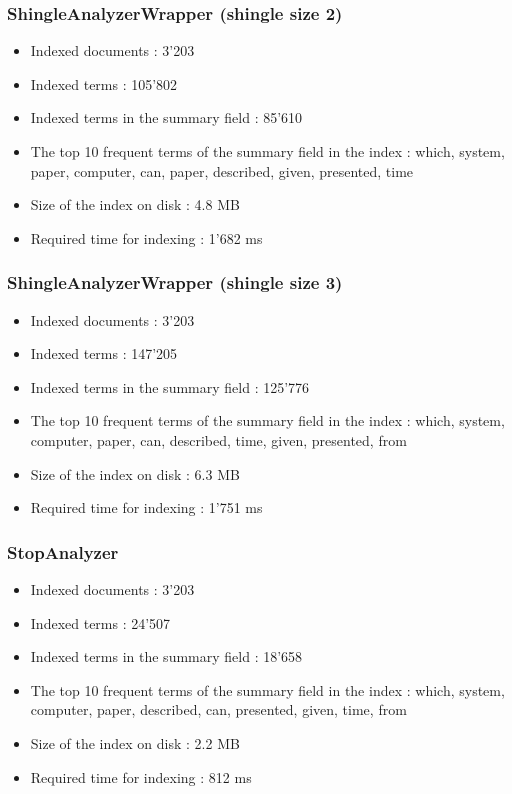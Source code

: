 \documentclass[11pt,a4paper,twoside,svgnames]{article}
\begin{document}
	\subsubsection{ShingleAnalyzerWrapper (shingle size 2)}
\begin{itemize}
	\item Indexed documents : 3'203
	\item Indexed terms : 105'802
	\item Indexed terms in the summary field : 85'610
	\item The top 10 frequent terms of the summary field in the index : which, system, paper, computer, can, paper, described, given, presented, time
	\item Size of the index on disk : 4.8 MB
	\item Required time for indexing : 1'682 ms
\end{itemize}

	\subsubsection{ShingleAnalyzerWrapper (shingle size 3)}
\begin{itemize}
	\item Indexed documents : 3'203
	\item Indexed terms : 147'205
	\item Indexed terms in the summary field : 125'776
	\item The top 10 frequent terms of the summary field in the index : which, system, computer, paper, can, described, time, given, presented, from
	\item Size of the index on disk : 6.3 MB
	\item Required time for indexing : 1'751 ms
\end{itemize}

	\subsubsection{StopAnalyzer}
\begin{itemize}
	\item Indexed documents : 3'203
	\item Indexed terms : 24'507
	\item Indexed terms in the summary field : 18'658
	\item The top 10 frequent terms of the summary field in the index : which, system, computer, paper, described, can, presented, given, time, from
	\item Size of the index on disk : 2.2 MB
	\item Required time for indexing : 812 ms
\end{itemize}
	
\end{document}
